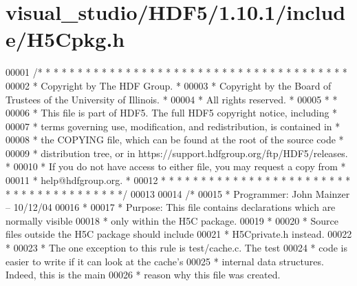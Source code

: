\hypertarget{visual__studio_2_h_d_f5_21_810_81_2include_2_h5_cpkg_8h_source}{}\section{visual\+\_\+studio/\+H\+D\+F5/1.10.1/include/\+H5\+Cpkg.h}
\label{visual__studio_2_h_d_f5_21_810_81_2include_2_h5_cpkg_8h_source}

\begin{DoxyCode}
00001 \textcolor{comment}{/* * * * * * * * * * * * * * * * * * * * * * * * * * * * * * * * * * * * * * *}
00002 \textcolor{comment}{ * Copyright by The HDF Group.                                               *}
00003 \textcolor{comment}{ * Copyright by the Board of Trustees of the University of Illinois.         *}
00004 \textcolor{comment}{ * All rights reserved.                                                      *}
00005 \textcolor{comment}{ *                                                                           *}
00006 \textcolor{comment}{ * This file is part of HDF5.  The full HDF5 copyright notice, including     *}
00007 \textcolor{comment}{ * terms governing use, modification, and redistribution, is contained in    *}
00008 \textcolor{comment}{ * the COPYING file, which can be found at the root of the source code       *}
00009 \textcolor{comment}{ * distribution tree, or in https://support.hdfgroup.org/ftp/HDF5/releases.  *}
00010 \textcolor{comment}{ * If you do not have access to either file, you may request a copy from     *}
00011 \textcolor{comment}{ * help@hdfgroup.org.                                                        *}
00012 \textcolor{comment}{ * * * * * * * * * * * * * * * * * * * * * * * * * * * * * * * * * * * * * * */}
00013 
00014 \textcolor{comment}{/*}
00015 \textcolor{comment}{ * Programmer: John Mainzer -- 10/12/04}
00016 \textcolor{comment}{ *}
00017 \textcolor{comment}{ * Purpose:     This file contains declarations which are normally visible}
00018 \textcolor{comment}{ *              only within the H5C package.}
00019 \textcolor{comment}{ *}
00020 \textcolor{comment}{ *      Source files outside the H5C package should include}
00021 \textcolor{comment}{ *      H5Cprivate.h instead.}
00022 \textcolor{comment}{ *}
00023 \textcolor{comment}{ *      The one exception to this rule is test/cache.c.  The test}
00024 \textcolor{comment}{ *      code is easier to write if it can look at the cache's}
00025 \textcolor{comment}{ *      internal data structures.  Indeed, this is the main}
00026 \textcolor{comment}{ *      reason why this file was created.}

\end{DoxyCode}
